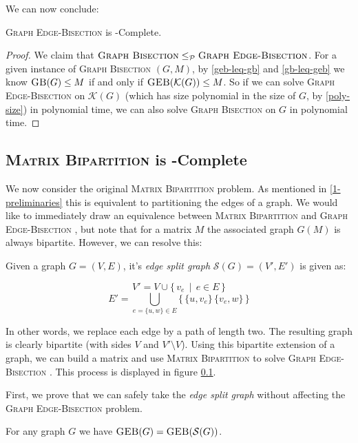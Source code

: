 \documentclass{article}
\newcommand{\mbpt}{\textsc{Matrix \allowbreak Bipartition} }
\newcommand{\gb}{\textsc{Graph \allowbreak Bisection} }
\newcommand{\geb}{\textsc{Graph \allowbreak Edge-\allowbreak Bisection} }
\newcommand{\sgeb}{\textsc{GEB} }
\newcommand{\sgb}{\textsc{GB} }
\begin{document}
	We can now conclude:

	\begin{theorem}
		\geb is \NP-Complete.
	\end{theorem}
	\begin{proof}
		We claim that $\gb \leq_{\mathcal{P}} \geb$.
		For a given instance of \gb $(G, M)$, by \autoref{geb-leq-gb} and
		\autoref{gb-leq-geb} we know
		$\sgb(G) \leq M$ if and only if $\sgeb(\mathcal{K}(G)) \leq M$. So
		if we can solve \geb on $\mathcal{K}(G)$ (which has size polynomial
		in the size of $G$, by \autoref{poly-size}) in polynomial time, we can
		also solve \gb on $G$ in polynomial time.
	\end{proof}

	\subsection{\mbpt is \NP-Complete}

	We now consider the original \mbpt problem. As mentioned in
	\autoref{1-preliminaries} this is equivalent to partitioning the edges of
	a graph. We would like to immediately draw an equivalence between \mbpt
	and \geb, but note that for a matrix $M$ the associated graph $G(M)$ is
	always bipartite. However, we can resolve this:

	\begin{definition}
		Given a graph $G = (V, E)$, it's \textit{edge split graph}
		$\mathcal{S}(G) = (V', E')$ is given as:

		$$V' = V \cup \{\, v_e \,\mid\, e \in E \,\}$$
		$$E' = \bigcup_{e = \{u, w\} \in E} \{\,\{u, v_e\}\, \{v_e, w\}\,\}$$
	\end{definition}

	In other words, we replace each edge by a path of length two. The resulting
	graph is clearly bipartite (with sides $V$ and $V' \setminus V$). Using
	this bipartite extension of a graph, we can build a matrix and use \mbpt
	to solve \geb. This process is displayed in figure \ref{}.


	First, we prove that we can safely take the \textit{edge split graph}
	without affecting the \geb problem.

	\begin{proposition}
		\label{split-graph}
		For any graph $G$ we have $\sgeb(G) = \sgeb(\mathcal{S}(G))$.
	\end{proposition}
\end{document}
